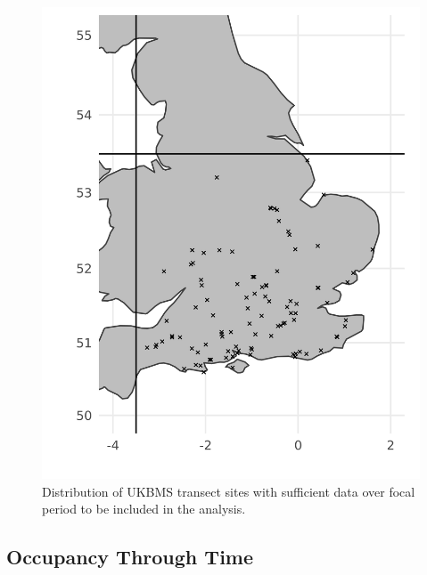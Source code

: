 \documentclass[
]{article}
\begin{document}
\begin{figure}
\centering
\includegraphics{ButterflyMarkdowns/ButterflySIFigs/ButterflySiteMaps.png}
\caption{Distribution of UKBMS transect sites with sufficient data over
focal period to be included in the analysis.}
\end{figure}

\hypertarget{occupancy-through-time}{%
\subsection{Occupancy Through Time}\label{occupancy-through-time}}
\end{document}
